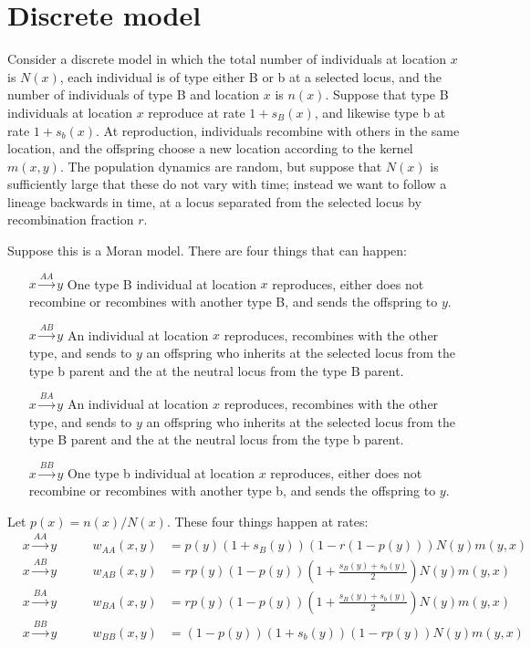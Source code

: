 \documentclass{article}
\begin{document}
\section{Discrete model}

Consider a discrete model in which the total number of individuals at location $x$ is $N(x)$,
each individual is of type either B or b at a selected locus,
and the number of individuals of type B and location $x$ is $n(x)$.
Suppose that type B individuals at location $x$ reproduce at rate $1+s_B(x)$, 
and likewise type b at rate $1+s_b(x)$.
At reproduction, individuals recombine with others in the same location,
and the offspring choose a new location according to the kernel $m(x,y)$.
The population dynamics are random, but suppose that $N(x)$ is sufficiently large that these do not vary with time;
instead we want to follow a lineage backwards in time,
at a locus separated from the selected locus by recombination fraction $r$.

Suppose this is a Moran model.
There are four things that can happen:
\begin{enumerate}
    \item[$x\xrightarrow{AA}y$] One type B individual at location $x$ reproduces, 
        either does not recombine or recombines with another type B,
        and sends the offspring to $y$.
    \item[$x\xrightarrow{AB}y$] An individual at location $x$ reproduces, 
        recombines with the other type,
        and sends to $y$ an offspring
        who inherits at the selected locus from the type b parent 
        and the at the neutral locus from the type B parent.
    \item[$x\xrightarrow{BA}y$] An individual at location $x$ reproduces, 
        recombines with the other type,
        and sends to $y$ an offspring
        who inherits at the selected locus from the type B parent 
        and the at the neutral locus from the type b parent.
    \item[$x\xrightarrow{BB}y$] One type b individual at location $x$ reproduces, 
        either does not recombine or recombines with another type b,
        and sends the offspring to $y$.
\end{enumerate}
Let $p(x) = n(x)/N(x)$.
These four things happen at rates:
\begin{align}
    & x\xrightarrow{AA}y & \qquad w_{AA}(x,y) &= p(y) (1+s_B(y)) \left(1 - r (1-p(y)) \right)  N(y) m(y,x) \\
    & x\xrightarrow{AB}y & \qquad w_{AB}(x,y) &= r p(y) (1-p(y)) \left(1+\frac{s_B(y)+s_b(y)}{2}\right) N(y) m(y,x) \\
    & x\xrightarrow{BA}y & \qquad w_{BA}(x,y) &= r p(y) (1-p(y)) \left(1+\frac{s_B(y)+s_b(y)}{2}\right) N(y) m(y,x) \\
    & x\xrightarrow{BB}y & \qquad w_{BB}(x,y) &= (1-p(y)) (1+s_b(y)) \left(1 - r p(y) \right) N(y) m(y,x) 
\end{align}
\end{document}
